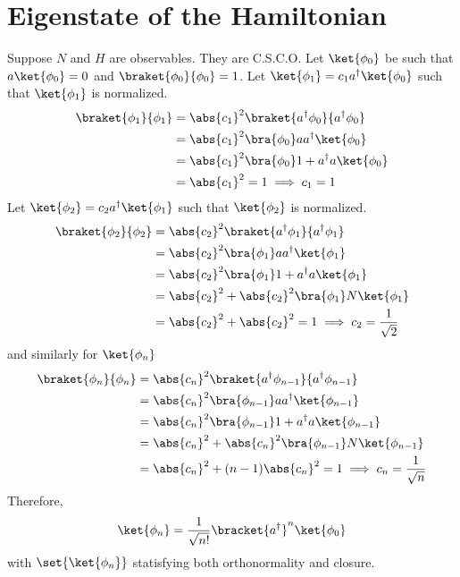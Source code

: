 \section{Eigenstate of the Hamiltonian}
Suppose \(N\) and \(H\) are observables. They are C.S.C.O. Let \(\ket{\phi_0}\) be such that \(a \ket{\phi_0} = 0\) and \(\braket{\phi_0}{\phi_0} = 1\). Let \(\ket{\phi_1} = c_1 a^{\dagger} \ket{\phi_0}\) such that \(\ket{\phi_1}\) is normalized.
\begin{align*}
    \braket{\phi_1}{\phi_1} & = \abs{c_1}^2 \braket{a^{\dagger} \phi_0}{a^{\dagger} \phi_0} \\
                            & = \abs{c_1}^2 \bra{\phi_0} aa^{\dagger} \ket{\phi_0}          \\
                            & = \abs{c_1}^2 \bra{\phi_0} 1 + a^{\dagger} a\ket{\phi_0}      \\
                            & = \abs{c_1}^2 = 1 \implies c_1 = 1
\end{align*}
Let \(\ket{\phi_2} = c_2 a^{\dagger} \ket{\phi_1}\) such that \(\ket{\phi_2}\) is normalized.
\begin{align*}
    \braket{\phi_2}{\phi_2} & = \abs{c_2}^2 \braket{a^{\dagger} \phi_1}{a^{\dagger} \phi_1}       \\
                            & = \abs{c_2}^2 \bra{\phi_1} aa^{\dagger} \ket{\phi_1}                \\
                            & = \abs{c_2}^2 \bra{\phi_1} 1 + a^{\dagger} a\ket{\phi_1}            \\
                            & = \abs{c_2}^2 + \abs{c_2}^2 \bra{\phi_1} N\ket{\phi_1}              \\
                            & = \abs{c_2}^2 + \abs{c_2}^2 = 1  \implies c_2 = \dfrac{1}{\sqrt{2}}
\end{align*}
and similarly for \(\ket{\phi_n}\)
\begin{align*}
    \braket{\phi_n}{\phi_n} & = \abs{c_{n}}^2 \braket{a^{\dagger} \phi_{n-1}}{a^{\dagger} \phi_{n-1}}  \\
                            & = \abs{c_n}^2 \bra{\phi_{n-1}} aa^{\dagger} \ket{\phi_{n-1}}             \\
                            & = \abs{c_n}^2 \bra{\phi_{n-1}} 1 + a^{\dagger} a\ket{\phi_{n-1}}         \\
                            & = \abs{c_n}^2 + \abs{c_n}^2 \bra{\phi_{n-1}} N\ket{\phi_{n-1}}           \\
                            & = \abs{c_n}^2 + (n-1)\abs{c_n}^2 = 1  \implies c_n = \dfrac{1}{\sqrt{n}}
\end{align*}
Therefore,
\begin{equation*}
    \ket{\phi_n} = \dfrac{1}{\sqrt{n!}} \bracket{a^{\dagger}}^n \ket{\phi_0}
\end{equation*}
with \(\set{\ket{\phi_n}}\) statisfying both orthonormality and closure.

